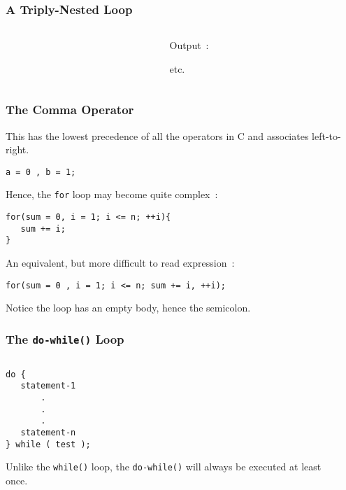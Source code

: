 \begin{frame}[fragile]
\frametitle{A Triply-Nested Loop}

\begin{columns}
\begin{column}{0.55\textwidth}

\end{column}

\begin{column}{0.40\textwidth}
{\scriptsize Output~:}

{\scriptsize etc.}

\end{column}

\end{columns}
\end{frame}

\begin{frame}[fragile]
\frametitle{The Comma Operator}

This has the lowest precedence of all the operators in C
and associates left-to-right.

\begin{lstlisting}[style=basicc,numbers=none]
a = 0 , b = 1;
\end{lstlisting}

Hence, the {\tt for} loop may become quite complex~:

\begin{lstlisting}[style=basicc,numbers=none]
for(sum = 0, i = 1; i <= n; ++i){
   sum += i;
}
\end{lstlisting}

An equivalent, but more difficult to read expression~:
\begin{lstlisting}[style=basicc,numbers=none]
for(sum = 0 , i = 1; i <= n; sum += i, ++i);
\end{lstlisting}

Notice the loop has an empty body, hence the semicolon.
\end{frame}

\begin{frame}[fragile]
\frametitle{The {\tt do-while()} Loop}

\begin{columns}
\begin{column}{0.35\textwidth}
\begin{lstlisting}[style=basicc,numbers=none]
do {
   statement-1
       .
       .
       .
   statement-n
} while ( test );
\end{lstlisting}

Unlike the \verb^while()^ loop, the \verb^do-while()^ will always
be executed at least once.
\end{column}

\pause
\begin{column}{0.60\textwidth}

\end{column}

\end{columns}
\end{frame}

